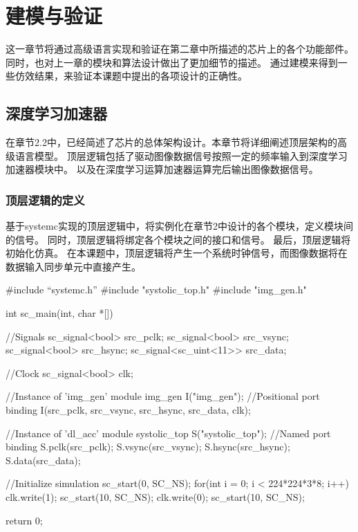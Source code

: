 
\chapter{建模与验证}
                                      
这一章节将通过高级语言实现和验证在第二章中所描述的芯片上的各个功能部件。
同时，也对上一章的模块和算法设计做出了更加细节的描述。
通过建模来得到一些仿效结果，来验证本课题中提出的各项设计的正确性。


\section{深度学习加速器}
在章节2.2中，已经简述了芯片的总体架构设计。本章节将详细阐述顶层架构的高级语言模型。
顶层逻辑包括了驱动图像数据信号按照一定的频率输入到深度学习加速器模块中。
以及在深度学习运算加速器运算完后输出图像数据信号。


\subsection{顶层逻辑的定义}
基于systemc实现的顶层逻辑中，将实例化在章节2中设计的各个模块，定义模块间的信号。
同时，顶层逻辑将绑定各个模块之间的接口和信号。
最后，顶层逻辑将初始化仿真。
在本课题中，顶层逻辑将产生一个系统时钟信号，而图像数据将在数据输入同步单元中直接产生。

\begin{codeblock}[language=c++]
#include “systemc.h”
#include "systolic_top.h"
#include "img_gen.h"

int sc_main(int, char *[])
{
  //Signals
  sc_signal<bool> src_pclk;
  sc_signal<bool> src_vsync;
  sc_signal<bool> src_hsync;
  sc_signal<sc_uint<11>> src_data;

  //Clock
  sc_signal<bool> clk;

  //Instance of 'img\_{}gen' module
  img_gen I("img_gen");
  //Positional port binding
  I(src_pclk, src_vsync, src_hsync, src_data, clk);

  //Instance of 'dl\_{}acc' module
  systolic_top S("systolic_top");
  //Named port binding
  S.pclk(src_pclk);
  S.vsync(src_vsync);
  S.hsync(src_hsync);
  S.data(src_data);

  //Initialize simulation
  sc_start(0, SC_NS);
  for(int i = 0; i < 224*224*3*8; i++){
    clk.write(1);
    sc_start(10, SC_NS);
    clk.write(0);
    sc_start(10, SC_NS);
  }

  return 0;
}

\end{codeblock}

